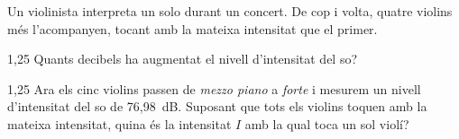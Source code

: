 Un violinista interpreta un solo durant un concert. De cop i volta, quatre violins més l'acompanyen, tocant amb la mateixa intensitat que el primer.

\begin{apartat}{1,25}
Quants decibels ha augmentat el nivell d'intensitat del so?
\end{apartat}

\begin{apartat}{1,25}
Ara els cinc violins passen de \textit{mezzo piano} a \textit{forte} i mesurem un nivell d'intensitat del so de 76,98~dB. Suposant que tots els violins toquen amb la mateixa intensitat, quina és la intensitat $I$ amb la qual toca un sol violí?
\end{apartat}

